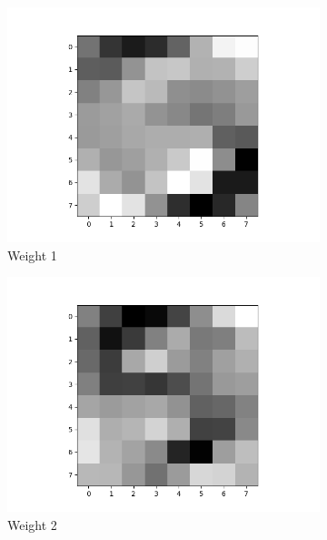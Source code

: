 \documentclass[12pt,letterpaper]{article}
\begin{document}
\begin{figure}
    \centering
    \begin{subfigure}[b]{0.24\textwidth}
        \includegraphics[width=\textwidth]{imgs/FA_weight_1.png}
        \caption{Weight 1}
        \label{FA_weight_1}
    \end{subfigure}
    \begin{subfigure}[b]{0.24\textwidth}
        \includegraphics[width=\textwidth]{imgs/FA_weight_2.png}
        \caption{Weight 2}
        \label{FA_weight_2}
    \end{subfigure}
    \begin{subfigure}[b]{0.24\textwidth}

\end{subfigure}
\end{figure}
\end{document}

